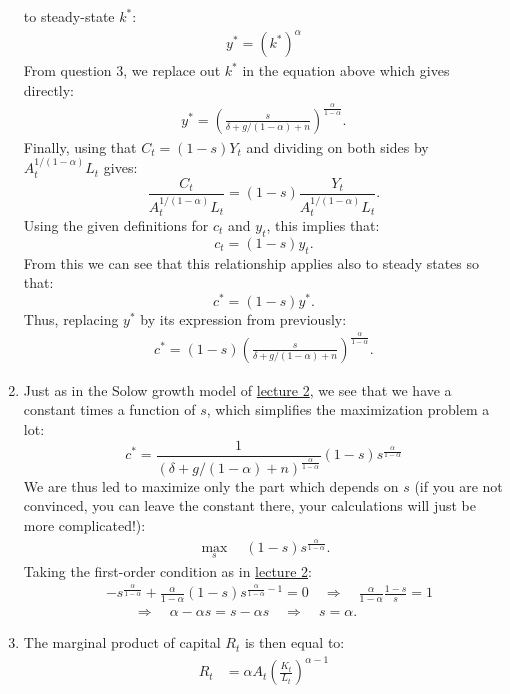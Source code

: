\documentclass[]{book}
\theoremstyle{definition}
\theoremstyle{definition}
\theoremstyle{definition}
\theoremstyle{remark}
\begin{document}
\begin{enumerate}
  to steady-state \(k^{*}\): \[
  \begin{aligned}
  y^*=\left(k^*\right)^\alpha
  \end{aligned}
  \] From question 3, we replace out \(k^{*}\) in the equation above
  which gives directly: \[
  \begin{aligned}
  \boxed{y^{*}=\left(\frac{s}{\delta+g/(1-\alpha)+n}\right)^{\frac{\alpha}{1-\alpha}}}.
  \end{aligned}
  \] Finally, using that \(C_t = (1-s)Y_t\) and dividing on both sides
  by \(A_t^{1/(1-\alpha)} L_t\) gives:
  \[\frac{C_t}{A_t^{1/(1-\alpha)} L_t}=(1-s)\frac{Y_t}{A_t^{1/(1-\alpha)} L_t}.\]
  Using the given definitions for \(c_t\) and \(y_t\), this implies
  that: \[c_t = (1-s)y_t.\] From this we can see that this relationship
  applies also to steady states so that: \[c^{*} = (1-s)y^{*}.\] Thus,
  replacing \(y^{*}\) by its expression from previously: \[
  \begin{aligned}
  \boxed{c^{*}=(1-s)\left(\frac{s}{\delta+g/(1-\alpha)+n}\right)^{\frac{\alpha}{1-\alpha}}}.
  \end{aligned}
  \]
\item
  Just as in the Solow growth model of \protect\hyperlink{solow}{lecture
  2}, we see that we have a constant times a function of \(s\), which
  simplifies the maximization problem a lot:
  \[c^{*}=\frac{1}{\left(\delta+g/(1-\alpha)+n\right)^{\frac{\alpha}{1-\alpha}}} (1-s)s^{\frac{\alpha}{1-\alpha}}\]
  We are thus led to maximize only the part which depends on \(s\) (if
  you are not convinced, you can leave the constant there, your
  calculations will just be more complicated!): \[
  \begin{aligned}
  \max_s \quad  (1-s)s^{\frac{\alpha}{1-\alpha}}.
  \end{aligned}
  \] Taking the first-order condition as in
  \protect\hyperlink{solow}{lecture 2}: \[
  \begin{aligned}
  &-s^{\frac{\alpha}{1-\alpha}}+\frac{\alpha}{1-\alpha}(1-s)s^{\frac{\alpha}{1-\alpha}-1} =0 \quad \Rightarrow\quad\frac{\alpha}{1-\alpha}\frac{1-s}{s}=1\\
  &\quad \quad \Rightarrow\quad\alpha-\alpha s=s-\alpha s \quad\Rightarrow\quad\boxed{s=\alpha}.
  \end{aligned}
  \]
\item
  The marginal product of capital \(R_t\) is then equal to: \[
  \begin{aligned}
  R_t&=\alpha A_t \left(\frac{K_t}{L_t}\right)^{\alpha-1}\\

\end{aligned}\]
\end{enumerate}
\end{document}
